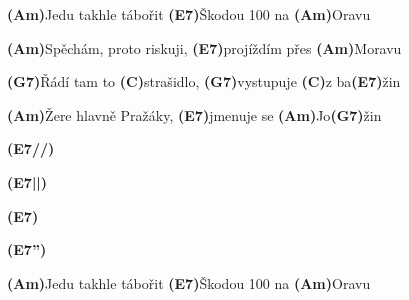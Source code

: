 \documentclass{article}
\newenvironment{song}{%
	\pagebreak%
	\parindent0pt%
    \Large%
}{%
}%
\newcommand{\SongTitle}[2]{%
	\begin{center}
	\Huge{#1} \Large{(#2)}\par%
	\end{center}%
    \addcontentsline{toc}{subsection}{#1 (#2)}%
}
\newcommand{\Capo}[1]{\textit{Original: Capo #1}\par}
\newcommand{\ch}[1]{\textbf{(#1)}}
\newcommand{\rep}[1]{\hspace{2pt}x#1}
\newcommand{\beatsymbol}{\textquotesingle}
\newcommand{\beats}[1]{%
  \myloopcounter0%
  \loop\ifnum\myloopcounter < #1 %
  \beatsymbol%
  \advance\myloopcounter by 1 %
  \repeat %
}
\newcommand{\beatsperchord}[1]{(X) = (X\beats#1)}
\newcommand{\rang}{\begin{picture}(5,7)
\put(1.1,2.5){\rotatebox{135}{\line(1,0){3.0}}}
\put(1.1,2.5){\rotatebox{225}{\line(1,0){3.0}}}
\end{picture}}
\newcommand{\Miss}{\cdot}
\newcommand{\Down}{\downarrow}
\newcommand{\AccentDown}{\stackrel{\rang}{\downarrow}}
\newcommand{\Up}{\uparrow}
\newcommand{\AccentUp}{\stackrel{\rang}{\uparrow}}
\begin{document}
\begin{song}
\bigskip

\ch{Am}Jedu takhle tábořit \ch{E7\halfNote}Škodou 100 na \ch{Am\halfNote}Oravu \par
\ch{Am}Spěchám, proto riskuji, \ch{E7\halfNote}projíždím přes \ch{Am\halfNote}Moravu \par
\ch{G7\halfNote}Řádí tam to \ch{C\halfNote}strašidlo, \ch{G7\halfNote}vystupuje
\ch{C\quarterNote}z ba\ch{E7\quarterNote}žin \par
\ch{Am}Žere hlavně Pražáky, \ch{E7\halfNote}jmenuje se
\ch{Am\quarterNote}Jo\ch{G7\quarterNote}žin \par

\bigskip

\ch{E7//} \par
\ch{E7||} \par
\ch{E7\textquotesingle\textquotesingle} \par
\ch{E7''} \par

\bigskip

\ch{Am}Jedu takhle tábořit \ch{E7\textquotesingle\textquotesingle}Škodou 100 na
\ch{Am\textquotesingle\textquotesingle}Oravu \par

\end{song}










\end{document}
